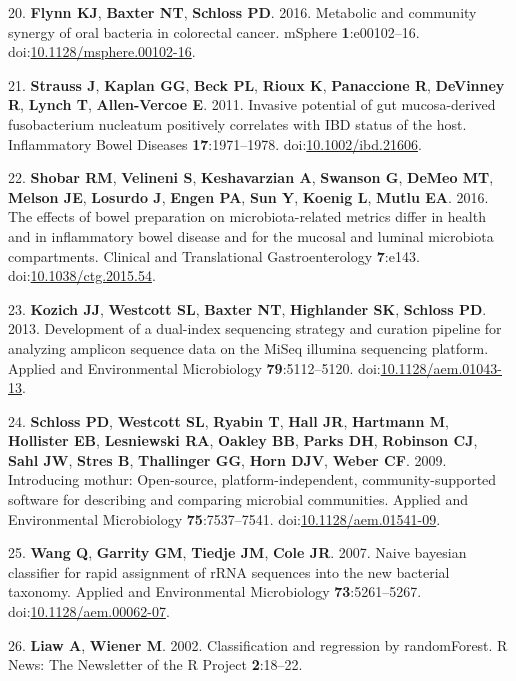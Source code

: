 \documentclass[11pt,]{article}
\begin{document}
\hypertarget{ref-Flynn2016}{}
20. \textbf{Flynn KJ}, \textbf{Baxter NT}, \textbf{Schloss PD}. 2016.
Metabolic and community synergy of oral bacteria in colorectal cancer.
mSphere \textbf{1}:e00102--16.
doi:\href{https://doi.org/10.1128/msphere.00102-16}{10.1128/msphere.00102-16}.

\hypertarget{ref-Strauss2011}{}
21. \textbf{Strauss J}, \textbf{Kaplan GG}, \textbf{Beck PL},
\textbf{Rioux K}, \textbf{Panaccione R}, \textbf{DeVinney R},
\textbf{Lynch T}, \textbf{Allen-Vercoe E}. 2011. Invasive potential of
gut mucosa-derived fusobacterium nucleatum positively correlates with
IBD status of the host. Inflammatory Bowel Diseases
\textbf{17}:1971--1978.
doi:\href{https://doi.org/10.1002/ibd.21606}{10.1002/ibd.21606}.

\hypertarget{ref-Shobar2016}{}
22. \textbf{Shobar RM}, \textbf{Velineni S}, \textbf{Keshavarzian A},
\textbf{Swanson G}, \textbf{DeMeo MT}, \textbf{Melson JE},
\textbf{Losurdo J}, \textbf{Engen PA}, \textbf{Sun Y}, \textbf{Koenig
L}, \textbf{Mutlu EA}. 2016. The effects of bowel preparation on
microbiota-related metrics differ in health and in inflammatory bowel
disease and for the mucosal and luminal microbiota compartments.
Clinical and Translational Gastroenterology \textbf{7}:e143.
doi:\href{https://doi.org/10.1038/ctg.2015.54}{10.1038/ctg.2015.54}.

\hypertarget{ref-Kozich2013}{}
23. \textbf{Kozich JJ}, \textbf{Westcott SL}, \textbf{Baxter NT},
\textbf{Highlander SK}, \textbf{Schloss PD}. 2013. Development of a
dual-index sequencing strategy and curation pipeline for analyzing
amplicon sequence data on the MiSeq illumina sequencing platform.
Applied and Environmental Microbiology \textbf{79}:5112--5120.
doi:\href{https://doi.org/10.1128/aem.01043-13}{10.1128/aem.01043-13}.

\hypertarget{ref-Schloss2009}{}
24. \textbf{Schloss PD}, \textbf{Westcott SL}, \textbf{Ryabin T},
\textbf{Hall JR}, \textbf{Hartmann M}, \textbf{Hollister EB},
\textbf{Lesniewski RA}, \textbf{Oakley BB}, \textbf{Parks DH},
\textbf{Robinson CJ}, \textbf{Sahl JW}, \textbf{Stres B},
\textbf{Thallinger GG}, \textbf{Horn DJV}, \textbf{Weber CF}. 2009.
Introducing mothur: Open-source, platform-independent,
community-supported software for describing and comparing microbial
communities. Applied and Environmental Microbiology
\textbf{75}:7537--7541.
doi:\href{https://doi.org/10.1128/aem.01541-09}{10.1128/aem.01541-09}.

\hypertarget{ref-Wang2007}{}
25. \textbf{Wang Q}, \textbf{Garrity GM}, \textbf{Tiedje JM},
\textbf{Cole JR}. 2007. Naive bayesian classifier for rapid assignment
of rRNA sequences into the new bacterial taxonomy. Applied and
Environmental Microbiology \textbf{73}:5261--5267.
doi:\href{https://doi.org/10.1128/aem.00062-07}{10.1128/aem.00062-07}.

\hypertarget{ref-Liaw2002}{}
26. \textbf{Liaw A}, \textbf{Wiener M}. 2002. Classification and
regression by randomForest. R News: The Newsletter of the R Project
\textbf{2}:18--22.
\end{document}
